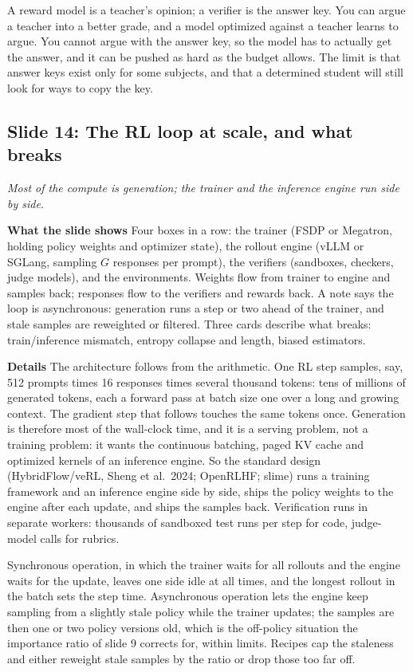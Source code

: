 \documentclass[11pt,letterpaper]{article}
\newcommand{\slide}[3]{%
  \subsection[Slide #1: #2]{Slide #1: #2}%
  {\color{muted}\itshape #3\par}\medskip}
\newcommand{\para}[1]{\medskip\noindent\textbf{#1}\quad}
\newenvironment{intuition}{\begin{tcolorbox}[intuitionbox]}{\end{tcolorbox}}
\begin{document}
\begin{intuition}
A reward model is a teacher's opinion; a verifier is the answer key. You can argue a teacher into a better grade, and a model optimized against a teacher learns to argue. You cannot argue with the answer key, so the model has to actually get the answer, and it can be pushed as hard as the budget allows. The limit is that answer keys exist only for some subjects, and that a determined student will still look for ways to copy the key.
\end{intuition}

\slide{14}{The RL loop at scale, and what breaks}{Most of the compute is generation; the trainer and the inference engine run side by side.}

\para{What the slide shows} Four boxes in a row: the trainer (FSDP or Megatron, holding policy weights and optimizer state), the rollout engine (vLLM or SGLang, sampling $G$ responses per prompt), the verifiers (sandboxes, checkers, judge models), and the environments. Weights flow from trainer to engine and samples back; responses flow to the verifiers and rewards back. A note says the loop is asynchronous: generation runs a step or two ahead of the trainer, and stale samples are reweighted or filtered. Three cards describe what breaks: train/inference mismatch, entropy collapse and length, biased estimators.

\para{Details} The architecture follows from the arithmetic. One RL step samples, say, 512 prompts times 16 responses times several thousand tokens: tens of millions of generated tokens, each a forward pass at batch size one over a long and growing context. The gradient step that follows touches the same tokens once. Generation is therefore most of the wall-clock time, and it is a serving problem, not a training problem: it wants the continuous batching, paged KV cache and optimized kernels of an inference engine. So the standard design (HybridFlow/veRL, Sheng et al.\ 2024; OpenRLHF; slime) runs a training framework and an inference engine side by side, ships the policy weights to the engine after each update, and ships the samples back. Verification runs in separate workers: thousands of sandboxed test runs per step for code, judge-model calls for rubrics.

Synchronous operation, in which the trainer waits for all rollouts and the engine waits for the update, leaves one side idle at all times, and the longest rollout in the batch sets the step time. Asynchronous operation lets the engine keep sampling from a slightly stale policy while the trainer updates; the samples are then one or two policy versions old, which is the off-policy situation the importance ratio of slide 9 corrects for, within limits. Recipes cap the staleness and either reweight stale samples by the ratio or drop those too far off.
\end{document}
